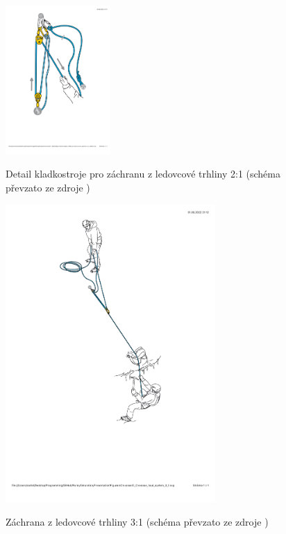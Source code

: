\begin{figure}[h]
    \centering
    {\includegraphics[width=4.0cm]{Figures/Crevasse/1_Petzl_Crevasse_haul_system_2_1_detail.pdf}}%
    \caption[Crevasse 2:1 detail]{Detail kladkostroje pro záchranu z ledovcové trhliny 2:1 (schéma převzato ze zdroje \cite{Petzl_2022})}
    \label{Obr:Crevasse_2:1_detail}
\end{figure}
\begin{figure}[h]
    \centering
    {\includegraphics[width=8.0cm]{Figures/Crevasse/2_Petzl_Crevasse_haul_system_3_1.pdf}}%
    \caption[Crevasse 3:1]{Záchrana z ledovcové trhliny 3:1 (schéma převzato ze zdroje \cite{Petzl_2022})}
    \label{Obr:Crevasse_3:1}
\end{figure}
